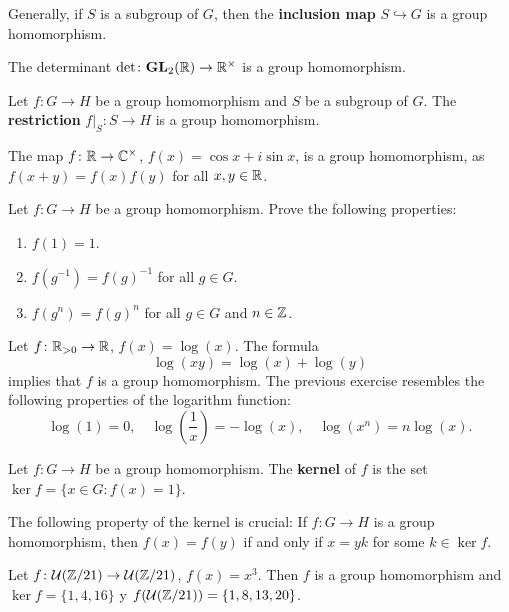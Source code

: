 Generally, if $S$ is a subgroup of $G$, 
then the \textbf{inclusion map}  $S\hookrightarrow G$ is a group
homomorphism. 

\begin{example}
The determinant $\det\colon\mathbf{GL}_2(\mathbb{R})\to\mathbb{R}^\times$ is a group homomorphism. 
\end{example}

\begin{example}
    Let $f\colon G\to H$ be a group homomorphism and
    $S$ be a subgroup of $G$.
    The \textbf{restriction} $f|_S\colon S\to H$ is a group homomorphism. 
\end{example}

\begin{example}
The map $f\colon\mathbb{R}\to\mathbb{C}^\times$, $f(x)=\cos x+i\sin x$, is a group
homomorphism, as 
$f(x+y)=f(x)f(y)$ for all $x,y\in\mathbb{R}$.
\end{example}

\begin{exercise}
Let $f\colon G\to H$ be a group homomorphism. Prove the following properties: 
\begin{enumerate}
    \item $f(1)=1$.
    \item $f(g^{-1})=f(g)^{-1}$ for all $g\in G$.
    \item $f(g^n)=f(g)^n$ for all $g\in G$ and $n\in\mathbb{Z}$.
\end{enumerate}
\end{exercise}

\begin{example}
Let $f\colon\mathbb{R}_{>0}\to\mathbb{R}$, $f(x)=\log(x)$. The formula 
\[\log(xy)=\log(x)+
\log(y)
\]
implies that $f$ is a group homomorphism. 
The previous exercise resembles 
the following properties of the logarithm function: 
\[
\log(1)=0,
\quad
\log\left(\frac{1}{x}\right)=-\log(x),
\quad
\log(x^n)=n\log(x).
\]
\end{example}

\begin{definition}
        Let $f\colon G\to H$ be a group homomorphism. The \textbf{kernel} of $f$
        is the set 
        $\ker f=\{x\in G:f(x)=1\}$.
\end{definition}

The following property of the kernel is crucial: If $f\colon G\to H$
is a group homomorphism, then 
$f(x)=f(y)$ if and only if $x=yk$ for some $k\in\ker f$.

\begin{example}
Let $f\colon\mathcal{U}(\mathbb{Z}/21)\to\mathcal{U}(\mathbb{Z}/21)$, $f(x)=x^3$. 
Then $f$ is a group homomorphism and 
$\ker f=\{1,4,16\}$ y $f(\mathcal{U}(\mathbb{Z}/21))=\{1,8,13,20\}$.
\end{example}


